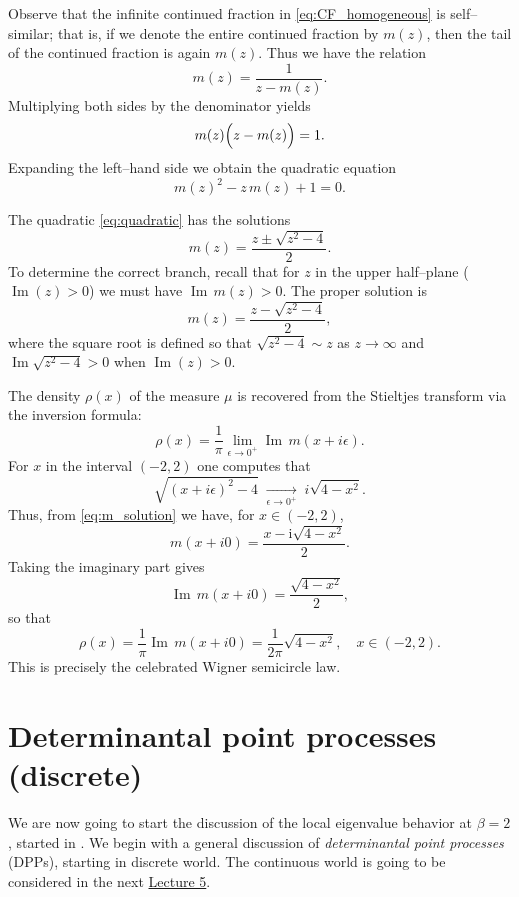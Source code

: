 \documentclass[letterpaper,11pt,oneside,reqno]{article}
\numberwithin{equation}{section}
\theoremstyle{definition}
\begin{document}
Observe that the infinite continued fraction in \eqref{eq:CF_homogeneous} is self--similar; that is, if we denote the entire continued fraction by \(m(z)\), then the tail of the continued fraction is again \(m(z)\). Thus we have the relation
\[
m(z)=\frac{1}{z-m(z)}.
\]
Multiplying both sides by the denominator yields
\[
m(z)\Bigl(z-m(z)\Bigr)=1.
\]
Expanding the left--hand side we obtain the quadratic equation
\begin{equation}\label{eq:quadratic}
m(z)^2-z\,m(z)+1=0.
\end{equation}


The quadratic \eqref{eq:quadratic} has the solutions
\[
m(z)=\frac{z\pm\sqrt{z^2-4}}{2}.
\]
To determine the correct branch, recall that for \(z\) in the upper half--plane (\(\operatorname{Im}(z)>0\)) we must have \(\operatorname{Im}\,m(z)>0\). The proper solution is
\begin{equation}\label{eq:m_solution}
m(z)=\frac{z-\sqrt{z^2-4}}{2},
\end{equation}
where the square root is defined so that \(\sqrt{z^2-4}\sim z\) as \(z\to\infty\) and \(\operatorname{Im}\sqrt{z^2-4}>0\) when \(\operatorname{Im}(z)>0\).


The density \(\rho(x)\) of the measure \(\mu\) is recovered from the Stieltjes transform via the inversion formula:
\[
\rho(x)=\frac{1}{\pi}\lim_{\epsilon\to0^+}\operatorname{Im}\,m(x+i\epsilon).
\]
For \(x\) in the interval \((-2,2)\) one computes that
\[
\sqrt{(x+i\epsilon)^2-4}\;\xrightarrow[\epsilon\to0^+]{}\; i\sqrt{4-x^2}.
\]
Thus, from \eqref{eq:m_solution} we have, for \(x\in(-2,2)\),
\[
m(x+i0)=\frac{x-\mathrm{i}\sqrt{4-x^2}}{2}.
\]
Taking the imaginary part gives
\[
\operatorname{Im}\,m(x+i0)=\frac{\sqrt{4-x^2}}{2},
\]
so that
\[
\rho(x)=\frac{1}{\pi}\operatorname{Im}\,m(x+i0)=\frac{1}{2\pi}\sqrt{4-x^2},\quad x\in(-2,2).
\]
This is precisely the celebrated Wigner semicircle law.



\section{Determinantal point processes (discrete)}
\label{sec:determinantal}

We are now going to start the discussion of the local eigenvalue
behavior at $\beta=2$, started in .
We begin with a general discussion of \emph{determinantal point processes} (DPPs),
starting in discrete world. The continuous world is going to be considered in the next
\href{https://lpetrov.cc/rmt25/rmt25-notes/rmt2025-l05.pdf}{Lecture 5}.
\end{document}
